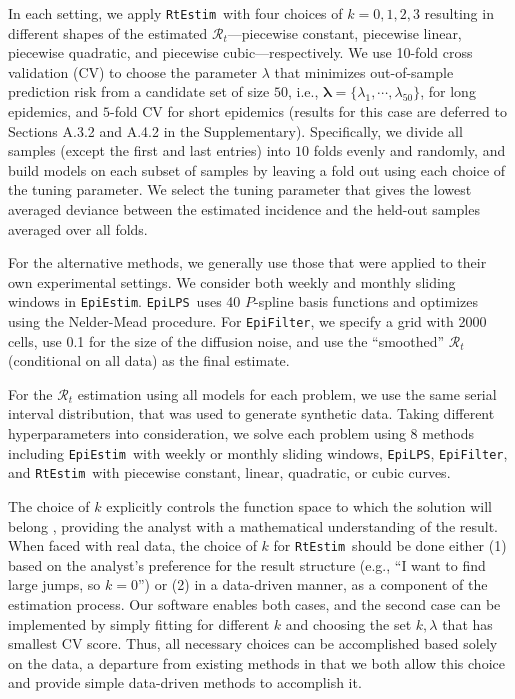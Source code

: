 \documentclass[10pt,letterpaper]{article}
\def\RtEstim{\texttt{RtEstim}}
\def\EpiEstim{\texttt{EpiEstim}}
\def\EpiLPS{\texttt{EpiLPS}}
\def\EpiFilter{\texttt{EpiFilter}}
\def\calR{\mathcal{R}}
\begin{document}
In each setting, we apply \RtEstim\ with four choices of $k=0,1, 2, 3$ resulting
in different shapes of the estimated $\calR_t$---piecewise constant, piecewise
linear, piecewise quadratic, and piecewise cubic---respectively. We use 10-fold
cross validation (CV) to choose the parameter $\lambda$ that minimizes
out-of-sample prediction risk from a candidate
set of size $50$, i.e., $\boldsymbol{\lambda} = \{\lambda_1, \cdots,
\lambda_{50}\}$, for long epidemics, and $5$-fold CV for short epidemics
(results for this case are deferred to Sections A.3.2 and A.4.2 in the
Supplementary). Specifically, we divide all samples (except the first and last
entries) into $10$ folds evenly and randomly, and build models on each subset of
samples by leaving a fold out using each choice of the tuning parameter. We
select the tuning parameter that gives the lowest averaged deviance between the
estimated incidence and the held-out samples averaged over all folds. 

For the alternative methods, we generally use those that were applied to their
own experimental settings. We consider both weekly and monthly sliding windows
in \EpiEstim. \EpiLPS\ uses 40 $P$-spline basis functions and optimizes using
the Nelder-Mead procedure. For \EpiFilter, we specify a grid with 2000 cells,
use 0.1 for the size of the diffusion noise, and use the ``smoothed'' $\calR_t$
(conditional on all data) as the final estimate. 

For the $\calR_t$ estimation using all models for each problem, we use the same
serial interval distribution, that was used to generate synthetic data. Taking
different hyperparameters into consideration, we solve each problem using 8
methods including \EpiEstim\ with weekly or monthly sliding windows, \EpiLPS,
\EpiFilter, and \RtEstim\ with piecewise constant, linear, quadratic, or cubic
curves. 

The choice of $k$ explicitly controls the function space to which the solution
will belong \cite{tibshirani2022divided}, providing the analyst with a
mathematical understanding of the result. When faced with real data, the choice
of $k$ for \RtEstim\ should be done either (1) based on the analyst's preference
for the result structure (e.g., ``I want to find large jumps, so $k=0$'') or (2)
in a data-driven manner, as a component of the estimation process.  Our software
enables both cases, and the second case can be implemented by simply fitting for
different $k$ and choosing the set $k,\lambda$ that has smallest CV score. Thus,
all necessary choices can be accomplished based solely on the data, a departure
from existing methods in that we both allow this choice and provide simple
data-driven methods to accomplish it.
\end{document}
